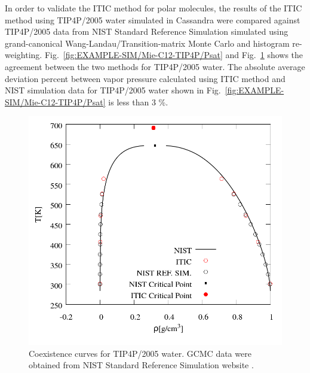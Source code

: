 \documentclass[5p,times]{elsarticle}
\begin{document}
In order to validate the ITIC method for polar molecules, the results of the ITIC method using TIP4P/2005 water simulated in Cassandra were compared against TIP4P/2005 data from NIST Standard Reference Simulation \cite{Shen2008} simulated using grand-canonical Wang-Landau/Transition-matrix Monte Carlo and histogram re-weighting. Fig.~\ref{fig:EXAMPLE-SIM/Mie-C12-TIP4P/Psat} and Fig.~\ref{fig:EXAMPLE-SIM/TIP4P05/T_rho} shows the agreement between the two methods for TIP4P/2005 water. The absolute average deviation percent between vapor pressure calculated using ITIC method and NIST simulation data for TIP4P/2005 water shown in Fig.~\ref{fig:EXAMPLE-SIM/Mie-C12-TIP4P/Psat} is less than 3 \%. 



\begin{figure}
\includegraphics[scale=0.30]{Figures/EXAMPLE-SIM_TIP4P05_trho.png}
\caption{Coexistence curves for TIP4P/2005 water. GCMC data were obtained from NIST Standard Reference Simulation website \cite{Shen2008}.}
\label{fig:EXAMPLE-SIM/TIP4P05/T_rho}
\end{figure}
\end{document}
